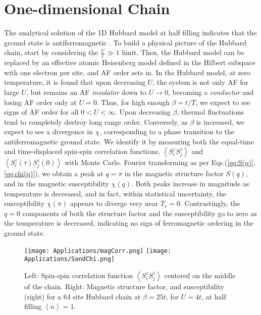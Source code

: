 \section{One-dimensional Chain}
\label{sec:1d-chain}

The analytical solution of the \acs{1D} Hubbard model at half filling indicates that the ground state is antiferromagnetic \cite{lieb_absence_1968}.
To build a physical picture of the Hubbard chain, start by considering the $\frac{U}{t} \gg 1$ limit. 
Then, the Hubbard model can be replaced by an effective atomic Heisenberg model defined in the Hilbert subspace with one electron per site, and \ac{AF} order sets in.
In the Hubbard model, at zero temperature, it is found that upon decreasing $U$, the system is not only \acs{AF} for large $U$, but remains an \acs{AF} \emph{insulator} down to $U \rightarrow 0$, becoming a \emph{conductor} and losing \acs{AF} order only at $U = 0$.
Thus, for high enough $\beta = t / T$, we expect to see signs of \acs{AF} order for all $0 < U < \infty$.
Upon decreasing $\beta$, thermal fluctuations tend to completely destroy long range order.
Conversely, as $\beta$ is increased, we expect to see a divergence in $\chi$, corresponding to a phase transition to the antiferromagnetic ground state.
We identify it by measuring both the equal-time and time-displaced spin-spin correlation functions, $\left\langle S^z_i  S^z_j \right\rangle$ and $\left\langle S^z_i (\tau) S^z_j (0) \right\rangle$ with Monte Carlo.
Fourier transforming as per Eqs.(\ref{eq:S(q)},\ref{eq:chi(q)}), we obtain a peak at $q = \pi$ in the magnetic structure factor $S ( q ) $, and in the magnetic susceptibility $\chi (q)$.
Both peaks increase in magnitude as temperature is decreased, and in fact, within statistical uncertainty, the  susceptibility $\chi (\pi)$ appears to diverge very near $T_c = 0$.
Contrastingly, the $q = 0$ components of both the structure factor and the susceptibility go to zero as the temperature is decreased, indicating  no sign of ferromagnetic ordering in the ground state.
\begin{figure}[H]\label{fig:corr_FT}
\hspace{0.2cm}
\texttt{[image: Applications/magCorr.png]}
\hspace{0.7cm}
\texttt{[image: Applications/SandChi.png]}
\caption[Spin-spin correlation function, magnetic structure factor, and susceptibility for a 64 site Hubbard chain at $\beta = 25 t$, for $U = 4$.]{Left: Spin-spin correlation function $\left\langle S^z_i S^z_j \right\rangle$ centered on the middle of the chain.
Right: Magnetic structure factor, and susceptibility (right) for a 64 site Hubbard chain at $\beta = 25 t$, for $U = 4t$, at half filling $\left\langle n \right\rangle = 1$.}
\end{figure}
